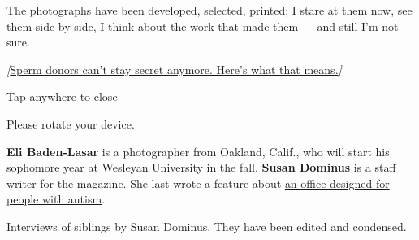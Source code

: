 The photographs have been developed, selected, printed; I stare at them
now, see them side by side, I think about the work that made them ---
and still I'm not sure.

\emph{{[}}\href{https://www.nytimes3xbfgragh.onion/2019/06/26/magazine/sperm-donor-questions.html}{Sperm
donors can't stay secret anymore. Here's what that means.}\emph{{]}}

Tap anywhere to close

Please rotate your device.

\textbf{Eli Baden-Lasar} is a photographer from Oakland, Calif., who
will start his sophomore year at Wesleyan University in the fall.
\textbf{Susan Dominus} is a staff writer for the magazine. She last
wrote a feature about
\href{https://www.nytimes3xbfgragh.onion/interactive/2019/02/21/magazine/autism-office-design.html}{an
office designed for people with autism}.

Interviews of siblings by Susan Dominus. They have been edited and
condensed.

\subsection{}

